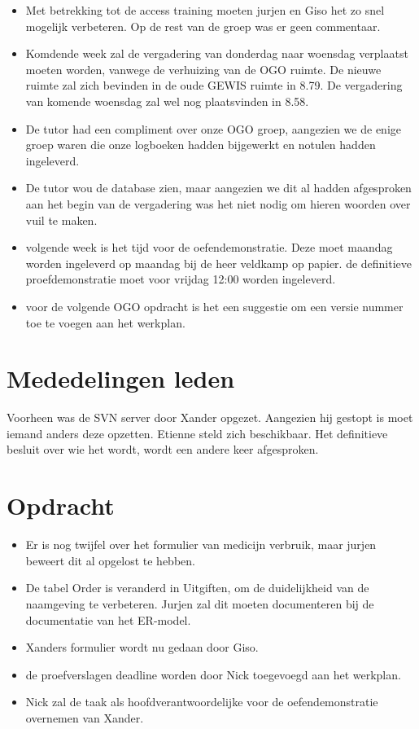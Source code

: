 \documentclass[]{article}
\begin{document}
  \begin{itemize}
     \item Met betrekking tot de access training moeten jurjen en
     Giso het zo snel mogelijk verbeteren. Op de rest van de groep
     was er geen commentaar.
     \item Komdende week zal de vergadering van donderdag
      naar woensdag verplaatst moeten worden, vanwege de verhuizing
      van de OGO ruimte. De nieuwe ruimte zal zich bevinden in de
      oude GEWIS ruimte in 8.79. De vergadering van komende woensdag
      zal wel nog plaatsvinden in 8.58.
      \item De tutor had een compliment over onze OGO groep,
      aangezien we de enige groep waren die onze logboeken hadden
      bijgewerkt en notulen hadden ingeleverd.
      \item De tutor wou de database zien, maar aangezien we dit al
      hadden afgesproken aan het begin van de vergadering was het
      niet nodig om hieren woorden over vuil te maken.
      \item volgende week is het tijd voor de oefendemonstratie. Deze
      moet maandag worden ingeleverd op maandag bij de heer veldkamp
      op papier. de definitieve proefdemonstratie moet voor vrijdag
      12:00 worden ingeleverd.
      \item voor de volgende OGO opdracht is het een suggestie om een
      versie nummer toe te voegen aan het werkplan.
  \end{itemize}

\section{Mededelingen leden}
Voorheen was de SVN server door Xander opgezet. Aangezien hij
gestopt is moet iemand anders deze opzetten. Etienne steld zich
beschikbaar. Het definitieve besluit over wie het wordt, wordt een
andere keer afgesproken.

\section{Opdracht}
\begin{itemize}
   \item Er is nog twijfel over het formulier van medicijn verbruik,
   maar jurjen beweert dit al opgelost te hebben.
   \item De tabel Order is veranderd in Uitgiften, om de
   duidelijkheid van de naamgeving te verbeteren. Jurjen zal dit
   moeten documenteren bij de documentatie van het ER-model.
   \item Xanders formulier wordt nu gedaan door Giso.
   \item de proefverslagen deadline worden door Nick toegevoegd aan
   het werkplan.
   \item Nick zal de taak als hoofdverantwoordelijke voor de
   oefendemonstratie overnemen van Xander.
\end{itemize}
\end{document}
